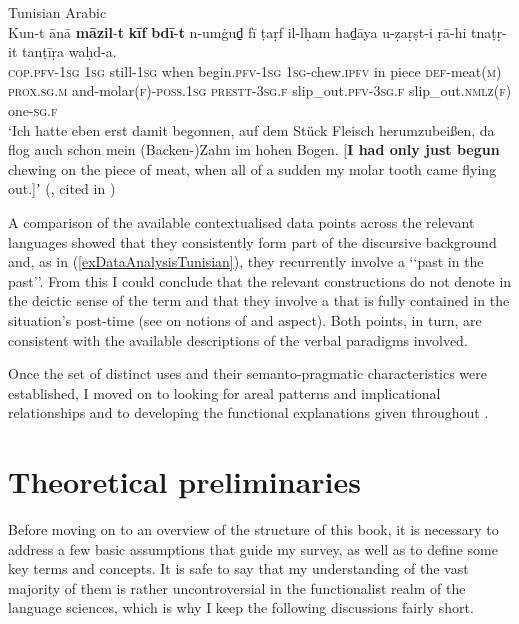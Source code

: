 \begin{exe}
	\ex Tunisian Arabic\label{exDataAnalysisTunisian}\\
	\gll Kun-t ānā \textbf{māzil}-\textbf{t} \textbf{kīf} \textbf{bdī}-\textbf{t} n-umġud̠̣ fī ṭaṛf il-lḥam had̠āya u-ẓaṛṣt-i ṛā-hi tnaṭṛ-it tanṭīṛa waḥd-a.\\
	\textsc{cop}.\textsc{pfv}-1\textsc{sg} 1\textsc{sg} still-1\textsc{sg} when begin.\textsc{pfv}-1\textsc{sg} 1\textsc{sg}-chew.\textsc{ipfv} in piece \textsc{def}-meat(\textsc{m}) \textsc{prox}.\textsc{sg}.\textsc{m} and-molar(\textsc{f})-\textsc{poss}.1\textsc{sg} \textsc{prestt}-3\textsc{sg}.\textsc{f} slip\_out.\textsc{pfv}-3\textsc{sg}.\textsc{f} slip\_out.\textsc{nmlz}(\textsc{f}) one-\textsc{sg}.\textsc{f}\\
	\glt \lq Ich hatte eben erst damit begonnen, auf dem Stück Fleisch herumzubeißen, da flog auch schon mein (Backen-)Zahn im hohen Bogen. [\textbf{I had only just begun} chewing on the piece of meat, when all of a sudden my molar tooth came flying out.]ʼ (\cite[651]{Singer1984}, cited in \cite{FischerEtAlTunisian})	
\end{exe}

A comparison of the available contextualised data points across the relevant languages showed that they consistently form part of the discursive background and, as in (\ref{exDataAnalysisTunisian}), they recurrently involve a \lq\lq past in the past\rq\rq{}. From this I could conclude that the relevant constructions do not denote  in the deictic sense of the term and that they involve a  that is fully contained in the situation's post-time (see  on notions of  and aspect). Both points, in turn, are consistent with the available descriptions of the verbal paradigms involved.

Once the set of distinct uses and their semanto-pragmatic characteristics were established, I moved on to looking for areal patterns and implicational relationships and to developing the functional explanations given throughout .

\section{Theoretical preliminaries}
\label{sectionKeyConcepts}
Before moving on to an overview of the structure of this book, it is necessary to address a few basic assumptions that guide my survey, as well as to define some key terms and concepts. It is safe to say that my understanding of the vast majority of them is rather uncontroversial in the functionalist realm of the language sciences, which is why I keep the following discussions fairly short.

